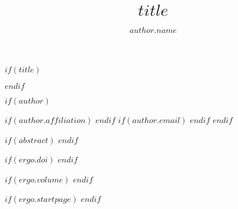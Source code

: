 $if(title)$
\title{$title$}
$endif$

$if(author)$
\author{$author.name$}
$if(author.affiliation)$
$endif$
$if(author.email)$
$endif$
$endif$

$if(abstract)$
%
$endif$

$if(ergo.doi)$
$endif$

$if(ergo.volume)$
%
$endif$

$if(ergo.startpage)$
\setcounter{page}{$ergo.startpage$}%
$endif$

